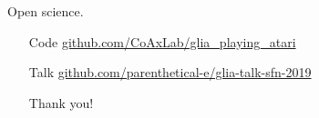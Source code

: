 \documentclass[10pt]{beamer}
\begin{document}
\begin{frame}[fragile]{Open science.}
\begin{itemize}
\item[Code] \url{github.com/CoAxLab/glia_playing_atari}
\item[Talk] \url{github.com/parenthetical-e/glia-talk-sfn-2019}
\item[] 
\item[] \alert{Thank you!}
\end{itemize}
\end{frame}


%   
%   

\end{document}
